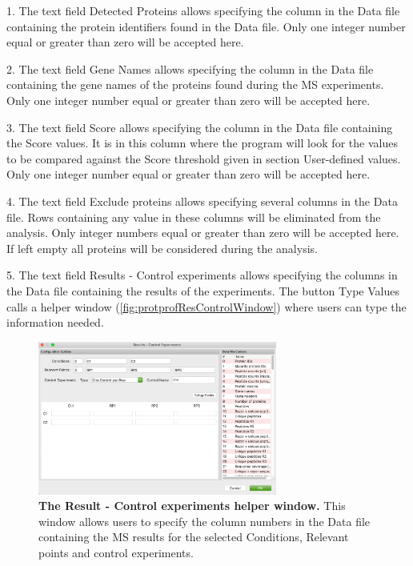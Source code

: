 \num{1}. The text field Detected Proteins allows specifying the column in
the Data file containing the protein identifiers found in the Data file. Only one
integer number equal or greater than zero will be accepted here.

\num{2}. The text field Gene Names allows specifying the column in the Data
file containing the gene names of the proteins found during the MS experiments.
Only one integer number equal or greater than zero will be accepted here.

\num{3}. The text field Score allows specifying the column in the Data file
containing the Score values. It is in this column where the program will look for
the values to be compared against the Score threshold given in section User-defined
values. Only one integer number equal or greater than zero will be accepted here.

\num{4}. The text field Exclude proteins allows specifying several columns
in the Data file. Rows containing any value in these columns will be eliminated from
the analysis. Only integer numbers equal or greater than zero will be accepted here.
If left empty all proteins will be considered during the analysis.

\num{5}. \label{par:protprofResultControl} The text field Results - Control experiments
allows specifying the columns in the Data file containing the results of the
experiments. The button Type Values calls a helper window (\autoref{fig:protprofResControlWindow})
where users can type the information needed.

\begin{figure}[h]
    \centering
    \includegraphics[width=0.7\textwidth]{./IMAGES/MOD-PROTPROF/protprof-rescontrol.jpg}
    \caption[The Result - Control experiments helper window]{\textbf{The Result -
    Control experiments helper window.} This window allows users to specify the column
    numbers in the Data file containing the MS results for the selected Conditions,
    Relevant points and control experiments.}
    \label{fig:protprofResControlWindow}
    \vspace{-5pt}
\end{figure}

